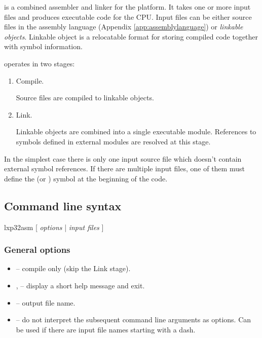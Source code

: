 \documentclass[a4paper,12pt,twoside,extrafontsizes]{memoir}
\begin{document}
 is a combined assembler and linker for the \lxp{} platform. It takes one or more input files and produces executable code for the CPU. Input files can be either source files in the \lxp{} assembly language (Appendix \ref{app:assemblylanguage}) or \emph{linkable objects}. Linkable object is a relocatable format for storing compiled \lxp{} code together with symbol information.

 operates in two stages:

\begin{enumerate}
	\item Compile.
	
	Source files are compiled to linkable objects.
	
	\item Link.
	
	Linkable objects are combined into a single executable module. References to symbols defined in external modules are resolved at this stage.
\end{enumerate}

In the simplest case there is only one input source file which doesn't contain external symbol references. If there are multiple input files, one of them must define the  (or ) symbol at the beginning of the code.

\subsection{Command line syntax}
\label{subsec:assemblercmdline}

\begin{codepar}
    lxp32asm [ \emph{options} | \emph{input files} ]
\end{codepar}

\subsubsection{General options}

\begin{itemize}
	\item {} -- compile only (skip the Link stage).
	
	\item {},  -- display a short help message and exit.
	
	\item {} -- output file name.
	
	\item \shellcmd{--} -- do not interpret the subsequent command line arguments as options. Can be used if there are input file names starting with a dash.
\end{itemize}
\end{document}
